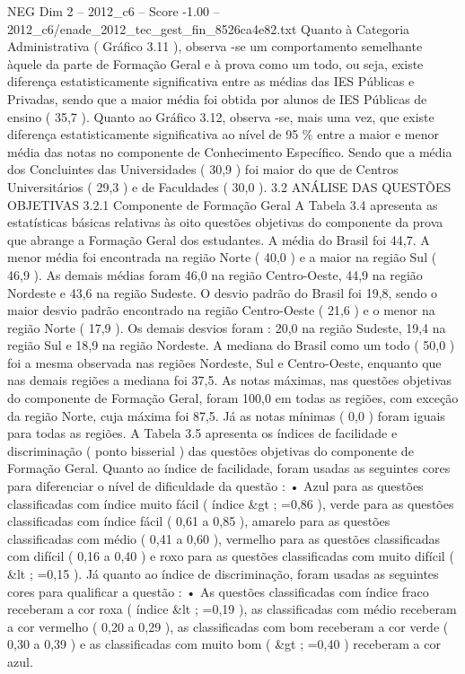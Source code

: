 \begin{textsample}{NEG Dim 2 – 2012\_c6 – Score -1.00 – 2012\_c6/enade\_2012\_tec\_gest\_fin\_8526ca4e82.txt}
Quanto à Categoria Administrativa ( Gráfico 3.11 ), observa -se um comportamento semelhante àquele da parte de Formação Geral e à prova como um todo, ou seja, existe diferença estatisticamente significativa entre as médias das IES Públicas e Privadas, sendo que a maior média foi obtida por alunos de IES Públicas de ensino ( 35,7 ).
Quanto ao Gráfico 3.12, observa -se, mais uma vez, que existe diferença estatisticamente significativa ao nível de 95 \% entre a maior e menor média das notas no componente de Conhecimento Específico.
Sendo que a média dos Concluintes das Universidades ( 30,9 ) foi maior do que de Centros Universitários ( 29,3 ) e de Faculdades ( 30,0 ). 3.2 ANÁLISE DAS QUESTÕES OBJETIVAS 3.2.1 Componente de Formação Geral A Tabela 3.4 apresenta as estatísticas básicas relativas às oito questões objetivas do componente da prova que abrange a Formação Geral dos estudantes.
A média do Brasil foi 44,7.
A menor média foi encontrada na região Norte ( 40,0 ) e a maior na região Sul ( 46,9 ).
As demais médias foram 46,0 na região Centro-Oeste, 44,9 na região Nordeste e 43,6 na região Sudeste.
O desvio padrão do Brasil foi 19,8, sendo o maior desvio padrão encontrado na região Centro-Oeste ( 21,6 ) e o menor na região Norte ( 17,9 ).
Os demais desvios foram : 20,0 na região Sudeste, 19,4 na região Sul e 18,9 na região Nordeste.
A mediana do Brasil como um todo ( 50,0 ) foi a mesma observada nas regiões Nordeste, Sul e Centro-Oeste, enquanto que nas demais regiões a mediana foi 37,5.
As notas máximas, nas questões objetivas do componente de Formação Geral, foram 100,0 em todas as regiões, com exceção da região Norte, cuja máxima foi 87,5.
Já as notas mínimas ( 0,0 ) foram iguais para todas as regiões.
A Tabela 3.5 apresenta os índices de facilidade e discriminação ( ponto bisserial ) das questões objetivas do componente de Formação Geral.
Quanto ao índice de facilidade, foram usadas as seguintes cores para diferenciar o nível de dificuldade da questão : • Azul para as questões classificadas com índice muito fácil ( índice \&gt ; =0,86 ), verde para as questões classificadas com índice fácil ( 0,61 a 0,85 ), amarelo para as questões classificadas com médio ( 0,41 a 0,60 ), vermelho para as questões classificadas com difícil ( 0,16 a 0,40 ) e roxo para as questões classificadas com muito difícil ( \&lt ; =0,15 ).
Já quanto ao índice de discriminação, foram usadas as seguintes cores para qualificar a questão : • As questões classificadas com índice fraco receberam a cor roxa ( índice \&lt ; =0,19 ), as classificadas com médio receberam a cor vermelho ( 0,20 a 0,29 ), as classificadas com bom receberam a cor verde ( 0,30 a 0,39 ) e as classificadas com muito bom ( \&gt ; =0,40 ) receberam a cor azul.

\end{textsample}
